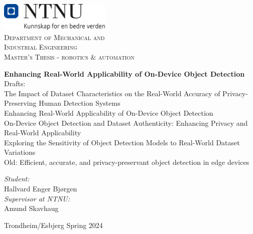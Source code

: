 \begin{titlepage}
\vbox{ }
\vbox{ }
\begin{center}
{\includegraphics[width=0.40\textwidth]{Images/NTNU_logo.png}}\\[1cm]
\textsc{\LARGE Department of Mechanical and  }\\[0.3cm]
\textsc{\LARGE Industrial Engineering}\\[1.5cm]
\textsc{\Large Master's Thesis - robotics \& automation}\\[0.5cm]
\vbox{ }

{ \huge \bfseries Enhancing Real-World Applicability of On-Device Object Detection}
\\[0.5cm]
Drafts:\\
The Impact of Dataset Characteristics on the Real-World Accuracy of Privacy-Preserving Human Detection Systems\\
Enhancing Real-World Applicability of On-Device Object Detection\\
On-Device Object Detection and Dataset Authenticity: Enhancing Privacy and Real-World Applicability\\
Exploring the Sensitivity of Object Detection Models to Real-World Dataset Variations\\
Old: Efficient, accurate, and privacy-preservant object detection in edge devices
\\[2.5cm] 



\large


\emph{Student:}\\
Hallvard Enger Bjørgen\\
\vspace{1cm}
\emph{Supervisor at NTNU:}\\
Amund Skavhaug
\vfill

{\large Trondheim/Esbjerg Spring 2024}
\end{center}
\end{titlepage}
